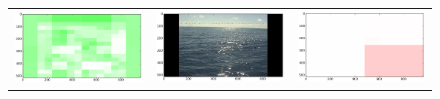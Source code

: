 \begin{figure}
\begin{tabular}{ccc}
\includegraphics[keepaspectratio=true,width=\segwidth]{images/segment/299_00__animals__.png} &
\includegraphics[keepaspectratio=true,width=\segwidth]{images/segment/299_00__image__.png} &
\includegraphics[keepaspectratio=true,width=\segwidth]{images/segment/299_00__plastic__.png} \\


\end{tabular}
\end{figure}
